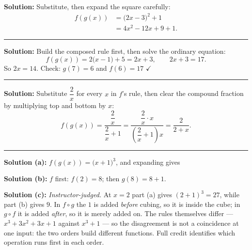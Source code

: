 \documentclass[12pt]{article}
\begin{document}

\textbf{Solution:} Substitute, then expand the square carefully:
\begin{align*}
  f(g(x)) &= \bigl(2x-3\bigr)^2 + 1 \\
          &= 4x^2 - 12x + 9 + 1 .
\end{align*}

\vspace{0.2cm}\noindent\rule{\linewidth}{0.2pt}\vspace{0.2cm}


\textbf{Solution:} Build the composed rule first, then solve the ordinary
equation:
\[ f(g(x)) = 2\bigl(x-1\bigr) + 5 = 2x + 3 , \qquad 2x + 3 = 17 . \]
So $2x = 14$. Check: $g(7) = 6$ and $f(6) = 17$ $\checkmark$ 

\vspace{0.2cm}\noindent\rule{\linewidth}{0.2pt}\vspace{0.2cm}


\textbf{Solution:} Substitute $\dfrac{2}{x}$ for every $x$ in $f$'s rule, then
clear the compound fraction by multiplying top and bottom by $x$:
\[ f(g(x)) = \frac{\dfrac{2}{x}}{\dfrac{2}{x} + 1}
           = \frac{\dfrac{2}{x} \cdot x}{\left(\dfrac{2}{x} + 1\right)x}
           = \frac{2}{2 + x} . \]

\vspace{0.2cm}\noindent\rule{\linewidth}{0.2pt}\vspace{0.2cm}


\textbf{Solution (a):} $f(g(x)) = \bigl(x+1\bigr)^3$, and expanding gives

\textbf{Solution (b):} $f$ first: $f(2) = 8$; then $g(8) = 8 + 1$. 

\textbf{Solution (c):} \emph{Instructor-judged.} At $x = 2$ part (a) gives
$(2+1)^3 = 27$, while part (b) gives $9$. In $f \circ g$ the $1$ is added
\emph{before} cubing, so it is inside the cube; in $g \circ f$ it is added
\emph{after}, so it is merely added on. The rules themselves differ ---
$x^3+3x^2+3x+1$ against $x^3+1$ --- so the disagreement is not a coincidence at
one input: the two orders build different functions. Full credit identifies which
operation runs first in each order.
\end{document}
